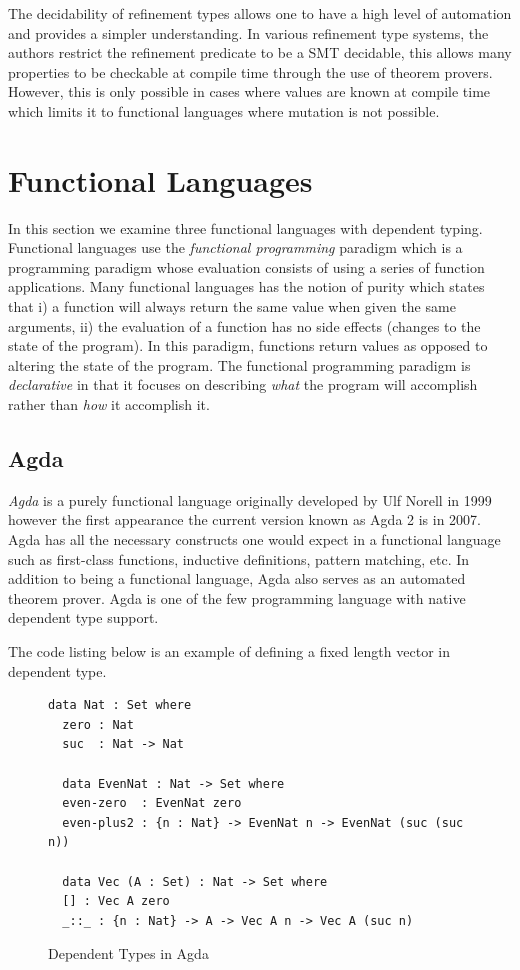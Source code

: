 \documentclass[a4paper,12pt]{report}
\begin{document}
\par
The decidability of refinement types allows one to have a high level of automation and 
provides a simpler understanding. In various refinement type systems, the authors  
restrict the refinement predicate to be a SMT decidable, this allows many 
properties to be checkable at compile time through the use of theorem provers. 
However, this is only possible in cases where values are known at compile time 
which limits it to functional languages where mutation is not possible. 

\section{Functional Languages}
In this section we examine three functional languages with 
dependent typing. Functional languages 
use the \textit{functional programming} \cite{overviewFP} paradigm which 
is a programming paradigm whose evaluation consists of using a series of function 
applications. Many functional languages has the notion of purity which states that i) 
a function will always return the same value when given the same arguments,  
ii) the evaluation of a function has no side effects (changes to the state of the program).
 In this paradigm, functions return values as opposed to 
altering the state of the program. The functional programming paradigm is 
\emph{declarative} in that it focuses on describing \textit{what} the program 
will accomplish rather than \textit{how} it accomplish it. 

\subsection{Agda} \label{section:agda}

\textit{Agda} \cite{agda} is a purely functional language originally developed by Ulf Norell in 
1999 however the first appearance the current version known as Agda 2 is in 
2007. Agda has all the necessary constructs one would expect in a functional 
language such as first-class functions, inductive definitions, pattern matching, 
etc. In addition to being a functional language, Agda also serves as an automated theorem prover. 
Agda is one of the few programming language with native dependent type support. 

\par
The code listing below is an example of defining a fixed length vector in 
dependent type. 

\begin{figure}[H]
  \begin{lstlisting}[mathescape=true] 
  data Nat : Set where 
  zero : Nat
  suc  : Nat -> Nat  
  
  data EvenNat : Nat -> Set where
  even-zero  : EvenNat zero
  even-plus2 : {n : Nat} -> EvenNat n -> EvenNat (suc (suc n))
  
  data Vec (A : Set) : Nat -> Set where
  [] : Vec A zero
  _::_ : {n : Nat} -> A -> Vec A n -> Vec A (suc n)
  \end{lstlisting}
  \caption{Dependent Types in Agda}
\end{figure}
\end{document}

